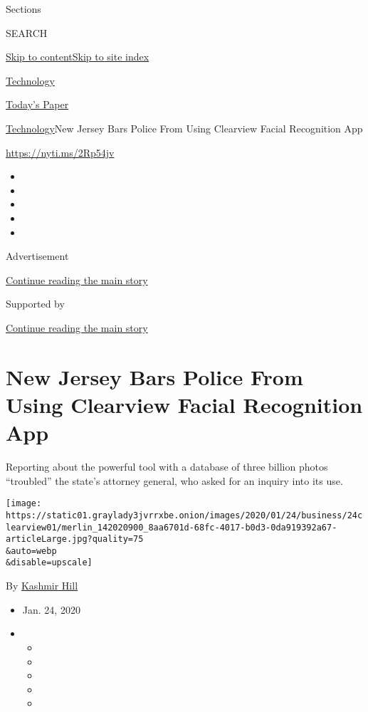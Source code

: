 Sections

SEARCH

\protect\hyperlink{site-content}{Skip to
content}\protect\hyperlink{site-index}{Skip to site index}

\href{https://www.nytimes3xbfgragh.onion/section/technology}{Technology}

\href{https://myaccount.nytimes3xbfgragh.onion/auth/login?response_type=cookie\&client_id=vi}{}

\href{https://www.nytimes3xbfgragh.onion/section/todayspaper}{Today's
Paper}

\href{/section/technology}{Technology}\textbar{}New Jersey Bars Police
From Using Clearview Facial Recognition App

\url{https://nyti.ms/2Rp54jv}

\begin{itemize}
\item
\item
\item
\item
\item
\end{itemize}

Advertisement

\protect\hyperlink{after-top}{Continue reading the main story}

Supported by

\protect\hyperlink{after-sponsor}{Continue reading the main story}

\hypertarget{new-jersey-bars-police-from-using-clearview-facial-recognition-app}{%
\section{New Jersey Bars Police From Using Clearview Facial Recognition
App}\label{new-jersey-bars-police-from-using-clearview-facial-recognition-app}}

Reporting about the powerful tool with a database of three billion
photos ``troubled'' the state's attorney general, who asked for an
inquiry into its use.

\texttt{[image: https://static01.graylady3jvrrxbe.onion/images/2020/01/24/business/24clearview01/merlin\_142020900\_8aa6701d-68fc-4017-b0d3-0da919392a67-articleLarge.jpg?quality=75\\\&auto=webp\\\&disable=upscale]}

By \href{https://www.nytimes3xbfgragh.onion/by/kashmir-hill}{Kashmir
Hill}

\begin{itemize}
\item
  Jan. 24, 2020
\item
  \begin{itemize}
  \item
  \item
  \item
  \item
  \item
  \end{itemize}
\end{itemize}

